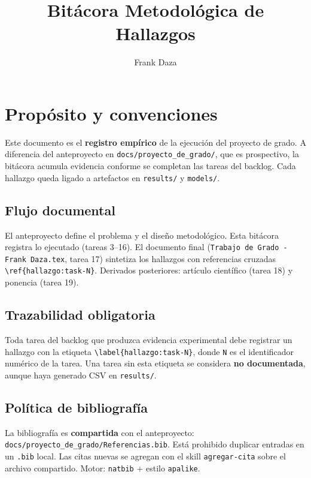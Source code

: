 \documentclass[12pt,letterpaper]{article}
\title{Bitácora Metodológica de Hallazgos}
\author{Frank Daza}
\begin{document}
\maketitle
\tableofcontents

\section{Propósito y convenciones}

Este documento es el \textbf{registro empírico} de la ejecución del proyecto de grado.
A diferencia del anteproyecto en \texttt{docs/proyecto\_de\_grado/}, que es prospectivo,
la bitácora acumula evidencia conforme se completan las tareas del backlog.
Cada hallazgo queda ligado a artefactos en \texttt{results/} y \texttt{models/}.

\subsection{Flujo documental}

El anteproyecto define el problema y el diseño metodológico.
Esta bitácora registra lo ejecutado (tareas 3--16).
El documento final (\texttt{Trabajo de Grado - Frank Daza.tex}, tarea 17) sintetiza
los hallazgos con referencias cruzadas \texttt{\textbackslash ref\{hallazgo:task-N\}}.
Derivados posteriores: artículo científico (tarea 18) y ponencia (tarea 19).

\subsection{Trazabilidad obligatoria}

Toda tarea del backlog que produzca evidencia experimental debe registrar un hallazgo
con la etiqueta \texttt{\textbackslash label\{hallazgo:task-N\}}, donde \texttt{N}
es el identificador numérico de la tarea.
Una tarea sin esta etiqueta se considera \textbf{no documentada}, aunque haya generado
CSV en \texttt{results/}.

\subsection{Política de bibliografía}

La bibliografía es \textbf{compartida} con el anteproyecto:
\texttt{docs/proyecto\_de\_grado/Referencias.bib}.
Está prohibido duplicar entradas en un \texttt{.bib} local.
Las citas nuevas se agregan con el skill \texttt{agregar-cita} sobre el archivo compartido.
Motor: \texttt{natbib} + estilo \texttt{apalike}.
\end{document}
